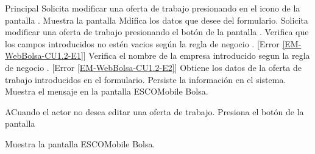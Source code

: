 	\begin{UCtrayectoria}{Principal}
	\UCpaso[\UCactor] Solicita modificar una oferta de trabajo presionando en el icono  de la pantalla .
	\UCpaso Muestra la pantalla 
	\UCpaso [\UCactor] Mdifica los datos que desee del formulario.
	\UCpaso [\UCactor] Solicita modificar una oferta de trabajo presionando el botón  de la pantalla .  
	\UCpaso Verifica que los campos introducidos no estén vacios según la regla de negocio . [Error \ref{EM-WebBolsa-CU1.2-E1}] 
	\UCpaso Verifica el nombre de la empresa introducido segun la regla de negocio  . [Error \ref{EM-WebBolsa-CU1.2-E2}] 
	\UCpaso Obtiene los datos de la oferta de trabajo introducidos en el formulario. 
	\UCpaso Persiste la información en el sistema.
	\UCpaso Muestra el mensaje  en la pantalla ESCOMobile Bolsa.  
	
	
	\end{UCtrayectoria}

\begin{UCtrayectoriaA}{A}{Cuando el actor no desea editar una oferta de trabajo.}
	\UCpaso [\UCactor] Presiona el botón  de la pantalla 

	\UCpaso Muestra la pantalla ESCOMobile Bolsa.  
\end{UCtrayectoriaA}
